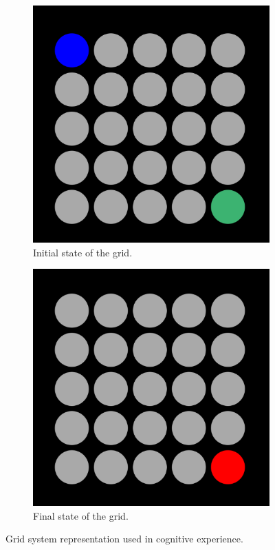 \documentclass[journal]{IEEEtran}
\begin{document}
{\begin{figure}[h!]
\begin{subfigure}{0.5\textwidth}
\includegraphics[width=0.9\linewidth,scale=0.9]{Images/grid_initial_state.png} 
\caption{Initial state of the grid.}
\label{fig:subim1}
\end{subfigure}
\begin{subfigure}{0.5\textwidth}
\includegraphics[width=0.9\linewidth,scale=0.9]{Images/grid_end_state.png}
\caption{Final state of the grid.}
\label{fig:subim2}
\end{subfigure}
\caption{Grid system representation used in cognitive experience.}
\label{fig:game_representation}
\end{figure}
}
\end{document}
